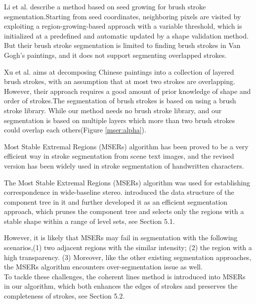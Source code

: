 Li et al.\cite{li2012rhythmic} describe a method based on seed growing for brush stroke segmentation.Starting from seed coordinates, neighboring pixels are visited by exploiting a region-growing-based approach with a variable threshold, which is initialized at a predefined and automatic updated by a shape validation method. But their brush stroke segmentation is limited to finding brush strokes in Van Gogh's paintings, and it does not support segmenting overlapped strokes.

Xu et al.\cite{xu2006animating} aims at decomposing Chinese paintings into a collection of layered brush strokes, with an assumption that at most two strokes are overlapping. However, their approach requires a good amount of prior knowledge of shape and order of strokes.The segmentation of brush strokes is based on using a brush stroke library. While our method needs no brush stroke library, and our segmentation is based on multiple layers which more than two brush strokes could overlap each others(Figure \ref{mser:alpha}). 

Most Stable Extremal Regions (MSERs) algorithm\cite{matas2004robust} has been proved to be a very efficient way in stroke segmentation from scene text images\cite{neumann2011text}\cite{gomez2013multi}, 
and the revised version has been widely used in stroke segmentation of handwritten characters\cite{gomez2016fast}.

The Most Stable Extremal Regions (MSERs) algorithm\cite{matas2004robust} was used for establishing correspondence in wide-baseline stereo.\cite{donoser2006efficient} introduced the data structure of the component tree in it and further developed it as an efficient segmentation approach, which prunes the component tree and selects only the regions with a stable shape within a range of level sets, see Section 5.1.

However, it is likely that MSERs may fail in segmentation with the following scenarios,\newline (1) two adjacent regions with the similar intensity; \newline (2) the region with a high transparency. \newline
(3) Moreover, like the other existing segmentation approaches, the MSERs algorithm encounters over-segmentation issue as well. \\
To tackle these challenges, the coherent lines method \cite{kang2007coherent} is introduced into MSERs in our algorithm, which both enhances the edges of strokes and preserves the completeness of strokes, see Section 5.2. 

\newpage